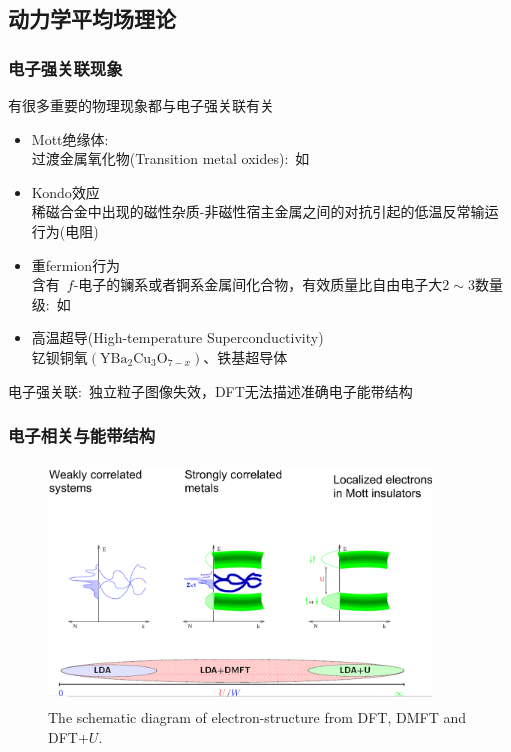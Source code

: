 {\subsection{动力学平均场理论}
\frame
{
	\frametitle{电子强关联现象}
	有很多重要的物理现象都与电子强关联有关
	\begin{itemize}
		\item \textrm{Mott}绝缘体:\\
			过渡金属氧化物\textrm{(Transition metal oxides)}:~如~\textrm{}
		\item \textrm{Kondo}效应\\
			稀磁合金中出现的磁性杂质-非磁性宿主金属之间的对抗引起的低温反常输运行为(电阻)
		\item 重\textrm{fermion}行为\\
			含有~$f$-电子的镧系或者锕系金属间化合物，有效质量比自由电子大$2\sim3$数量级:~如~\textrm{}
		\item 高温超导\textrm{(High-temperature Superconductivity)}\\
			钇钡铜氧$(\mathrm{YBa}_2\mathrm{Cu}_3\mathrm{O}_{7-x})$、铁基超导体
	\end{itemize}
	电子强关联:~独立粒子图像失效，\textrm{DFT}无法描述准确电子能带结构
}

\frame
{
	\frametitle{电子相关与能带结构}
\begin{figure}[h!]
\centering
\vspace{-12pt}
\includegraphics[height=2.5in,width=4.00in,viewport=0 0 1680 1000,clip]{Figures/DFT-DMFT-compare.png}
\caption{\textrm{\tiny The schematic diagram of electron-structure from DFT, DMFT and DFT+$U$.}}%
\label{DFT-DMFT-Hubbard}
\end{figure}
}

}
